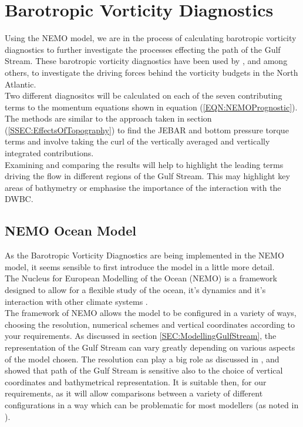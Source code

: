 \documentclass[..\EOYR.tex]{subfiles}
\begin{document}
\section{Barotropic Vorticity Diagnostics}
\label{SEC:Diagnostics}

Using the NEMO model, we are in the process of calculating barotropic vorticity diagnostics to further investigate the processes effecting the path of the Gulf Stream. These barotropic vorticity diagnostics have been used by \citep{Bell1999}, \citep{Gula2014} and \citep{Yeager2015} among others, to investigate the driving forces behind the vorticity budgets in the North Atlantic.\\

Two different diagnositcs will be calculated on each of the seven contributing terms to the momentum equations shown in equation (\ref{EQN:NEMOPrognostic}). The methods are similar to the approach taken in section (\ref{SSEC:EffectsOfTopography}) to find the JEBAR and bottom pressure torque terms and involve taking the curl of the vertically averaged and vertically integrated contributions.\\

Examining and comparing the results will help to highlight the leading terms driving the flow in different regions of the Gulf Stream. This may highlight key areas of bathymetry or emphasise the importance of the interaction with the DWBC.

\subsection{NEMO Ocean Model}
\label{SSEC:NEMO}

As the Barotropic Vorticity Diagnostics are being implemented in the NEMO model, it seems sensible to first introduce the model in a little more detail. \\
The Nucleus for European Modelling of the Ocean (NEMO) is a framework designed to allow for a flexible study of the ocean, it's dynamics and it's interaction with other climate systems \citep{Madec2011}. \\

The framework of NEMO allows the model to be configured in a variety of ways, choosing the resolution, numerical schemes and vertical coordinates according to your requirements. As discussed in section \ref{SEC:ModellingGulfStream}, the representation of the Gulf Stream can vary greatly depending on various aspects of the model chosen. The resolution can play a big role as discussed in \citep{Scaife2011a}, and \citep{Ezer2016b} showed that path of the Gulf Stream is sensitive also to the choice of vertical coordinates and bathymetrical representation. It is suitable then, for our requirements, as it will allow comparisons between a variety of different configurations in a way which can be problematic for most modellers (as noted in \citep{Ezer2016b}).\\
\end{document}
